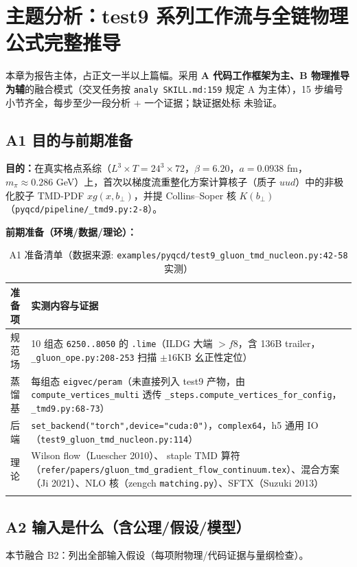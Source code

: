 \documentclass[UTF8]{ctexart}
\begin{document}
\section{主题分析：test9 系列工作流与全链物理公式完整推导}
\label{sec:topic}
本章为报告主体，占正文一半以上篇幅。采用 \textbf{A 代码工作框架为主、B 物理推导为辅}的融合模式（交叉任务按 \texttt{\nolinkurl{analy SKILL.md:159}} 规定 A 为主体），15 步编号小节齐全，每步至少一段分析 $+$ 一个证据；缺证据处标 \textcolor{warn}{未验证}。

\subsection{A1 目的与前期准备}
\textbf{目的：}在真实格点系综（$L^3\times T=24^3\times72$，$\beta=6.20$，$a=0.0938$ fm，$m_\pi\approx0.286$ GeV）上，首次以梯度流重整化方案计算核子（质子 $uud$）中的非极化胶子 TMD-PDF $xg(x,b_\perp)$，并提 Collins--Soper 核 $K(b_\perp)$（\texttt{\nolinkurl{pyqcd/pipeline/\_tmd9.py:2-8}}）。

\textbf{前期准备（环境/数据/理论）：}
\tiny
\begin{xltabular}{\textwidth}{lX}
\toprule
准备项 & 实测内容与证据 \\
\midrule
\endhead
规范场 & 10 组态 \texttt{\nolinkurl{6250..8050}} 的 \texttt{\nolinkurl{.lime}}（ILDG 大端 $>f8$，含 136B trailer，\texttt{\nolinkurl{\_gluon\_ope.py:208-253}} 扫描 $ \pm16$KB 幺正性定位） \\
蒸馏基 & 每组态 \texttt{\nolinkurl{eigvec/peram}}（未直接列入 test9 产物，由 \texttt{\nolinkurl{compute\_vertices\_multi}} 透传 \texttt{\nolinkurl{\_steps.compute\_vertices\_for\_config}}，\texttt{\nolinkurl{\_tmd9.py:68-73}}） \\
后端 & \texttt{\nolinkurl{set\_backend("torch",device="cuda:0")}}，\texttt{\nolinkurl{complex64}}，h5 通用 IO（\texttt{\nolinkurl{test9\_gluon\_tmd\_nucleon.py:114}}） \\
理论 & Wilson flow（Luescher 2010）、 staple TMD 算符（\texttt{\nolinkurl{refer/papers/gluon\_tmd\_gradient\_flow\_continuum.tex}}）、混合方案（Ji 2021）、NLO 核（zengch \texttt{\nolinkurl{matching.py}}）、SFTX（Suzuki 2013） \\
\bottomrule
\caption{A1 准备清单（数据来源: \texttt{\nolinkurl{examples/pyqcd/test9\_gluon\_tmd\_nucleon.py:42-58}} 实测）}
\end{xltabular}

\subsection{A2 输入是什么（含公理/假设/模型）}
\label{sec:a2}
本节融合 B2：列出全部输入假设（每项附物理/代码证据与量纲检查）。
\end{document}
